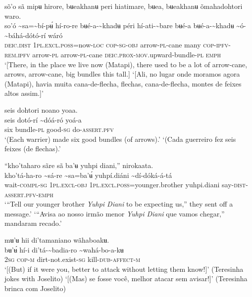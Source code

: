\documentclass[output=paper,
modfonts,nonflat
]{langsci/langscibook}
\begin{document}
\ea sõ'o sã mipʉ hirore, bʉeakhanʉ peri hiatimare, bʉea, bʉeakhanʉ õmahadohtori waro. \\[.3em]
\gll {\textasciitilde}so'ó	{\textasciitilde}sa={\textasciitilde}bí-pʉ́	hí-ro-re	bʉé-a-{\textasciitilde}khadʉ	péri	hí-ati-{\textasciitilde}bare bʉé-a	bʉé-a-{\textasciitilde}khadʉ	{\textasciitilde}ó-{\textasciitilde}báhá-dótó-rí	wáró\\
     \textsc{deic.dist}	1\textsc{pl.excl.poss}=now\textsc{-loc}	\textsc{cop-sg-obj}	arrow-\textsc{pl}-cane	many	\textsc{cop-ipfv-rem.ipfv} arrow-\textsc{pl}	arrow-\textsc{pl}-cane	\textsc{deic.prox-mov}.upward-bundle-\textsc{pl}	\textsc{emph} \\
\glt ‘[There, in the place we live now (Matapi), there used to be a lot of arrow-cane, arrows, arrow-cane, big bundles this tall.]
\glt ‘[Ali, no lugar onde moramos agora (Matapi), havia muita cana-de-flecha, flechas, cana-de-flecha, montes de feixes altos assim.]’
\z

\ea seis dohtori noano yoaa. \\[.3em]
\gll seis	dotó-rí	{\textasciitilde}dóá-ró	yoá-a \\
     six	bundle\textsc{-pl}	good\textsc{-sg}	do-\textsc{assert.pfv}\\
\glt ‘(Each warrier) made six good bundles (of arrows).’
\glt ‘(Cada guerreiro fez seis feixes (de flechas).’
\z 

\newpage 
\ea “kho'taharo sãre sã ba'ʉ yuhpi diani,” nirokaata. \\[.3em]
\gll kho'tá-ha-ro	{\textasciitilde}sá-re	{\textasciitilde}sa=ba'ʉ́	yuhpí.diáni	{\textasciitilde}dí-dóká-á-tá \\
     wait-\textsc{compl-sg}	1\textsc{pl.excl-obj}	1\textsc{pl.excl.poss}=younger.brother	yuhpi.diani	say-\textsc{dist-assert.pfv-emph}\\
\glt ‘“Tell our younger brother \textit{Yuhpi Diani} to be expecting us,” they sent off a message.’
\glt ‘“Avisa ao nosso irmão menor \textit{Yuhpi Diani} que vamos chegar,” mandaram recado.’
\z 

\ea mʉ'ʉ hii di'tamaniano wãhaboakʉ. \\[.3em]
\gll {\textasciitilde}bʉ'ʉ́	hí-i	di'tá-{\textasciitilde}badia{\footnotemark}-ro	{\textasciitilde}wahá-bo-a-kʉ \\
     2\textsc{sg}	\textsc{cop-m}	dirt-not.exist\textsc{-sg}	kill-\textsc{dub-affect-m}\\
\glt ‘[(But) if it were you, better to attack without letting them know!]’ (Teresinha jokes with Joselito)
\glt ‘[(Mas) se fosse você, melhor atacar sem avisar!]’ (Teresinha brinca com Joselito)
\z 
\end{document}

